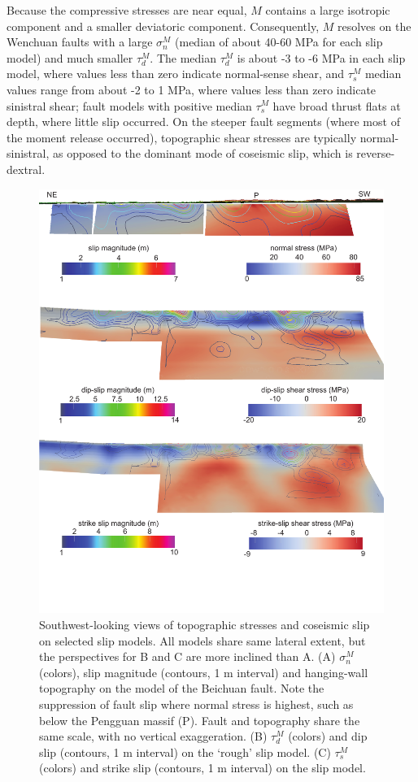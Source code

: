 \documentclass[twocolumn,jgrga]{AGUTeX}
\begin{document}
\begin{article}
Because the compressive stresses are near equal, $M$ contains a large
isotropic component and a smaller deviatoric component. Consequently, $M$
resolves on the Wenchuan faults with a large $\sigma^M_n$ (median of
about 40-60 MPa for each slip model) and much smaller $\tau^M_d$. The
median $\tau^M_d$ is about -3 to -6 MPa in each slip model, where values
less than zero indicate normal-sense shear, and $\tau^M_s$ median values
range from about -2 to 1 MPa, where values less than zero indicate
sinistral shear; fault models with positive median $\tau^M_s$ have broad
thrust flats at depth, where little slip occurred. On the steeper fault
segments (where most of the moment release occurred), topographic shear
stresses are typically normal-sinistral, as opposed to the dominant mode
of coseismic slip, which is reverse-dextral.

\begin{figure}[htbp]
\centering
\includegraphics[width=40pc]{../figures/fault_stress_3d.pdf}
\caption{Southwest-looking views of topographic stresses and coseismic
slip on selected slip models. All models share same lateral extent, but
the perspectives for B and C are more inclined than A. (A) $\sigma_n^M$
(colors), slip magnitude (contours, 1 m interval) and hanging-wall
topography on the \citet{feng2010} model of the Beichuan
fault. Note the suppression of fault slip where normal stress is
highest, such as below the Pengguan massif (P). Fault and topography
share the same scale, with no vertical exaggeration. (B) $\tau_d^M$ (colors)
and dip slip (contours, 1 m interval) on the \citet{qi2011}
`rough' slip model. (C) $\tau_s^M$ (colors) and strike slip (contours, 1
m interval) on the \citet{qi2011} slip model.}
\label{fig:fault_stress_3d}
\end{figure}


\end{article}
\end{document}
